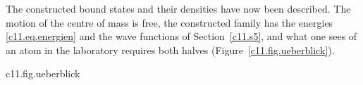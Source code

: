 The constructed bound states and their densities have now been described. The motion
of the centre of mass is free, the constructed family has the energies
\eqref{c11.eq.energien} and the wave functions of Section~\ref{c11.s5}, and what one
sees of an atom in the laboratory requires both halves (Figure~\ref{c11.fig.ueberblick}).

\begin{tpcfigure}{c11.fig.ueberblick}
  \caption{The route of the chapter as a diagram. The two-particle problem becomes two independent problems; the relative motion yields energies and wave functions. What is compared with the laboratory are the differences of the energies, as spectral lines, and densities, into which the state of the centre of mass enters.}
\end{tpcfigure}


